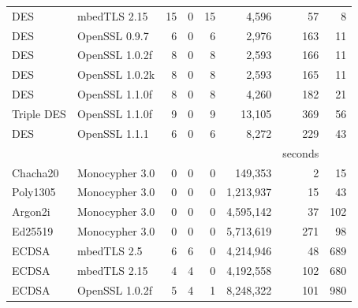 \begin{table}
\begin{tabular}{llrrrrrr}
    DES                & mbedTLS 2.15             & 15                & 0                 & 15             & 4,596       & 57      & 8     \\
    DES                & OpenSSL 0.9.7            & 6                 & 0                 & 6              & 2,976       & 163     & 11    \\
    DES                & OpenSSL 1.0.2f           & 8                 & 0                 & 8              & 2,593       & 166     & 11    \\
    DES                & OpenSSL 1.0.2k           & 8                 & 0                 & 8              & 2,593       & 165     & 11    \\
    DES                & OpenSSL 1.1.0f           & 8                 & 0                 & 8              & 4,260       & 182     & 21    \\
    Triple DES         & OpenSSL 1.1.0f &  9 &0  &9   &13,105   & 369 & 56\\
    DES                & OpenSSL 1.1.1            & 6                 & 0                 & 6              & 8,272       & 229     & 43    \\
                       &                          &                   &                   &                &             & seconds         \\\cline{7-7}
    Chacha20           & Monocypher 3.0           & 0                 & 0                 & 0              & 149,353     & 2       & 15    \\
    Poly1305           & Monocypher 3.0           & 0                 & 0                 & 0              & 1,213,937   & 15      & 43    \\
    Argon2i            & Monocypher 3.0           & 0                 & 0                 & 0              & 4,595,142   & 37      & 102   \\
    Ed25519            & Monocypher 3.0           & 0                 & 0                 & 0              & 5,713,619   & 271     & 98    \\
    ECDSA              & mbedTLS 2.5              & 6                 & 6                 & 0              & 4,214,946   & 48      & 689   \\
    ECDSA              & mbedTLS 2.15             & 4                 & 4                 & 0              & 4,192,558   & 102     & 680   \\
    ECDSA              & OpenSSL 1.0.2f           & 5                 & 4                 & 1              & 8,248,322   & 101     & 980   \\

\end{tabular}
\end{table}
